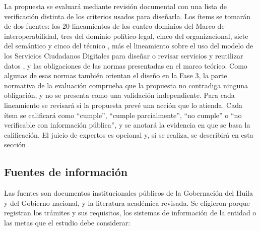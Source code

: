 La propuesta se evaluará mediante revisión documental con una lista de verificación distinta de los criterios usados para diseñarla. Los ítems se tomarán de dos fuentes: los 20 lineamientos de los cuatro dominios del Marco de interoperabilidad, tres del dominio político-legal, cinco del organizacional, siete del semántico y cinco del técnico \parencite[pp.~34, 38, 43-44, 47]{mintic2019marco}, más el lineamiento sobre el uso del modelo de los Servicios Ciudadanos Digitales para diseñar o revisar servicios y reutilizar datos \parencite[p.~77]{mintic2019marco}, y las obligaciones de las normas presentadas en el marco teórico. Como algunas de esas normas también orientan el diseño en la Fase 3, la parte normativa de la evaluación comprueba que la propuesta no contradiga ninguna obligación, y no se presenta como una validación independiente. Para cada lineamiento se revisará si la propuesta prevé una acción que lo atienda. Cada ítem se calificará como \enquote{cumple}, \enquote{cumple parcialmente}, \enquote{no cumple} o \enquote{no verificable con información pública}, y se anotará la evidencia en que se basa la calificación. El juicio de expertos es opcional y, si se realiza, se describirá en esta sección .

\subsection{Fuentes de información}

Las fuentes son documentos institucionales públicos de la Gobernación del Huila y del Gobierno nacional, y la literatura académica revisada. Se eligieron porque registran los trámites y sus requisitos, los sistemas de información de la entidad o las metas que el estudio debe considerar:

